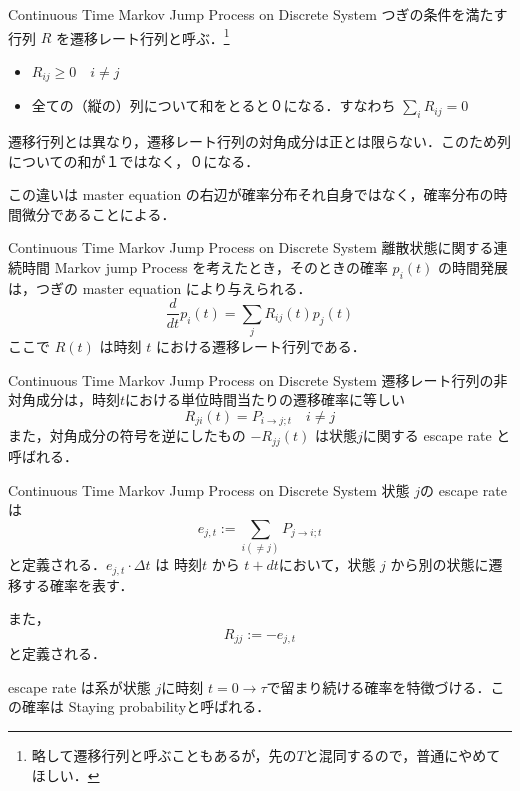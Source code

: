 \documentclass[aspectratio=169, dvipdfmx, 11pt,uplatex]{beamer} %
\begin{document}
\begin{frame}{Continuous Time Markov Jump Process on Discrete System}
  つぎの条件を満たす行列 $R$ を遷移レート行列と呼ぶ．\footnote{略して遷移行列と呼ぶこともあるが，先の$T$と混同するので，普通にやめてほしい．}
  \begin{itemize}
    \item $R_{ij} \geqslant 0 \quad i \neq j$
    \item 全ての（縦の）列について和をとると０になる．すなわち $\sum_i R_{ij} = 0$
  \end{itemize}
  遷移行列とは異なり，遷移レート行列の対角成分は正とは限らない．このため列についての和が１ではなく，０になる．\par 
  この違いは master equation の右辺が確率分布それ自身ではなく，確率分布の時間微分であることによる．
\end{frame}

\begin{frame}{Continuous Time Markov Jump Process on Discrete System}
  離散状態に関する連続時間 Markov jump Process を考えたとき，そのときの確率 $p_i(t)$ の時間発展は，つぎの master equation により与えられる．
  \begin{equation}
    \frac{d}{dt} p_i (t) = \sum_j R_{ij} (t) p_j (t)
  \end{equation}
  ここで $R(t)$ は時刻 $t$ における遷移レート行列である．
\end{frame}

\begin{frame}{Continuous Time Markov Jump Process on Discrete System}
  遷移レート行列の非対角成分は，時刻$t$における単位時間当たりの遷移確率に等しい
  \begin{equation}
    R_{ji} (t) = P_{i \to j ; t} \quad i \neq j
  \end{equation}
  また，対角成分の符号を逆にしたもの $- R_{jj} (t)$ は状態$j$に関する escape rate と呼ばれる．
\end{frame}

\begin{frame}{Continuous Time Markov Jump Process on Discrete System}
  状態 $j$の escape rate は 
  \begin{equation}
    e_{j, t} := \sum_{i (\neq j)} P_{j \to i ; t}
  \end{equation}
  と定義される．$e_{j, t} \cdot \Delta t$ は 時刻$t$ から $t + dt$において，状態 $j$ から別の状態に遷移する確率を表す．\par 
  また，
  \begin{equation}
    R_{jj} := - e_{j, t} 
  \end{equation}
  と定義される．\par 
  escape rate は系が状態 $j$に時刻 $t = 0 \to \tau $で留まり続ける確率を特徴づける．この確率は Staying probabilityと呼ばれる．
\end{frame}
\end{document}
